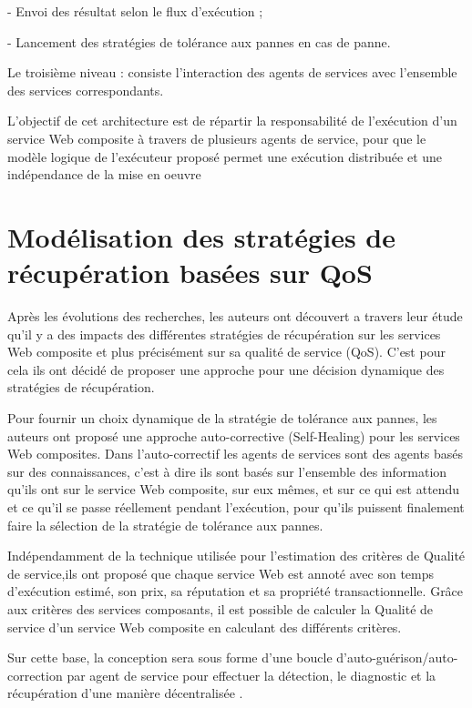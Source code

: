     - Envoi des résultat selon le flux d'exécution ;
    
    - Lancement des stratégies de tolérance aux pannes en cas de panne.

Le troisième niveau : consiste l'interaction des agents de services avec l'ensemble des services correspondants.

L'objectif de cet architecture est de répartir la responsabilité de l'exécution d'un service Web composite à travers de plusieurs agents de service, pour que le modèle logique de l'exécuteur proposé permet une exécution distribuée et une indépendance de la mise en oeuvre 

\section{Modélisation des stratégies de récupération basées sur QoS}

Après les évolutions des recherches, les auteurs ont découvert a travers leur étude qu'il y a des impacts des différentes stratégies de récupération sur les services Web composite et plus précisément sur sa qualité de service (QoS). C'est pour cela ils ont décidé de proposer une approche pour une décision dynamique des stratégies de récupération.

Pour fournir un choix dynamique de la stratégie de tolérance aux pannes, les auteurs ont proposé une approche auto-corrective (Self-Healing) pour les services Web composites.
Dans l'auto-correctif les agents de services sont des agents basés sur des connaissances, c'est à dire ils sont basés sur l'ensemble des information qu'ils ont sur le service Web composite, sur eux mêmes, et sur ce qui est attendu et ce qu'il se passe réellement pendant l'exécution, pour qu'ils puissent finalement faire la sélection de la stratégie de tolérance aux pannes.

Indépendamment de la technique utilisée pour l'estimation des critères de Qualité de service,ils ont proposé que chaque service Web est annoté avec son temps d'exécution estimé, son prix, sa réputation et sa propriété transactionnelle. Grâce aux critères des services composants, il est possible de calculer la Qualité de service d'un service Web composite en calculant des différents critères.

Sur cette base, la conception sera sous forme d'une boucle d'auto-guérison/auto-correction par agent de service pour effectuer la détection, le diagnostic et la récupération d'une manière décentralisée \cite{1}.


